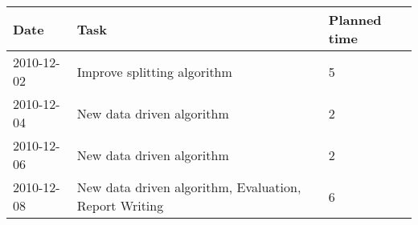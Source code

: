 \documentclass[11pt, accentcolor=tud9b, nochapname]{tudexercise}
\begin{document}
\vspace{10pt}
\begin{tabular}{l | l | l}
  \hline
  \textbf{Date} & \textbf{Task} & \textbf{Planned time} \\ \hline
  2010-12-02 & Improve splitting algorithm & 5 \\ \hline
  2010-12-04 & New data driven algorithm & 2 \\ \hline
  2010-12-06 & New data driven algorithm & 2 \\ \hline
  2010-12-08 & New data driven algorithm, Evaluation, Report Writing & 6 \\ \hline
\end{tabular}
\end{document}
